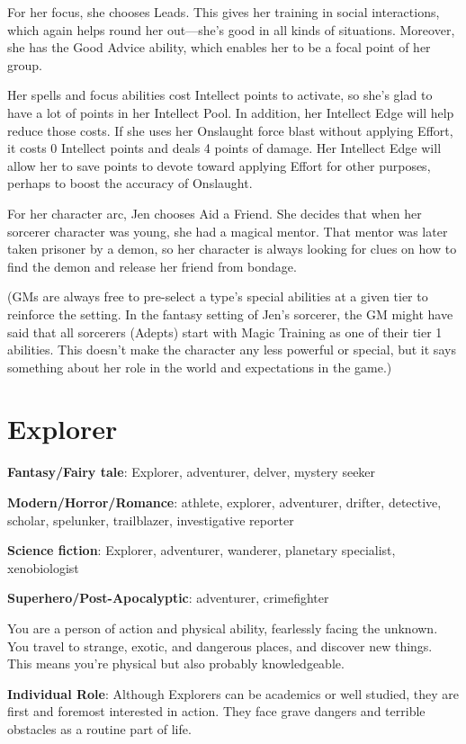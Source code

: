\begin{multicols}{2}
For her focus, she chooses Leads. This gives her training in social interactions, which again helps round her out—she’s good in all kinds of situations. Moreover, she has the Good Advice ability, which enables her to be a focal point of her group.

Her spells and focus abilities cost Intellect points to activate, so she’s glad to have a lot of points in her Intellect Pool. In addition, her Intellect Edge will help reduce those costs. If she uses her Onslaught force blast without applying Effort, it costs 0 Intellect points and deals 4 points of damage. Her Intellect Edge will allow her to save points to devote toward applying Effort for other purposes, perhaps to boost the accuracy of Onslaught.

For her character arc, Jen chooses Aid a Friend. She decides that when her sorcerer character was young, she had a magical mentor. That mentor was later taken prisoner by a demon, so her character is always looking for clues on how to find the demon and release her friend from bondage.

(GMs are always free to pre-select a type’s special abilities at a given tier to reinforce the setting. In the fantasy setting of Jen’s sorcerer, the GM might have said that all sorcerers (Adepts) start with Magic Training as one of their tier 1 abilities. This doesn’t make the character any less powerful or special, but it says something about her role in the world and expectations in the game.)

\section{Explorer}

\textbf{Fantasy/Fairy tale}: Explorer, adventurer, delver, mystery seeker

\textbf{Modern/Horror/Romance}: athlete, explorer, adventurer, drifter, detective, scholar, spelunker, trailblazer, investigative reporter

\textbf{Science fiction}: Explorer, adventurer, wanderer, planetary specialist, xenobiologist

\textbf{Superhero/Post-Apocalyptic}: adventurer, crimefighter

You are a person of action and physical ability, fearlessly facing the unknown. You travel to strange, exotic, and dangerous places, and discover new things. This means you’re physical but also probably knowledgeable.

\textbf{Individual Role}: Although Explorers can be academics or well studied, they are first and foremost interested in action. They face grave dangers and terrible obstacles as a routine part of life. 


\end{multicols}

